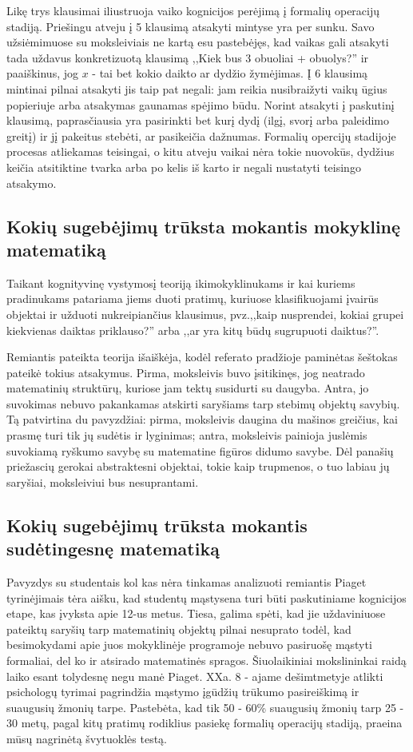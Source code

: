\documentclass{article}
\begin{document}
Likę trys klausimai iliustruoja vaiko kognicijos perėjimą į formalių operacijų stadiją. Priešingu atveju į 5 klausimą atsakyti mintyse yra per sunku. Savo užsiėmimuose su moksleiviais ne kartą esu pastebėjęs, kad vaikas gali atsakyti tada uždavus konkretizuotą klausimą ,,Kiek bus 3 obuoliai + obuolys?'' ir paaiškinus, jog $x$ - tai bet kokio daikto ar dydžio žymėjimas. Į 6 klausimą mintinai pilnai atsakyti jis taip pat negali: jam reikia nusibraižyti vaikų ūgius popieriuje arba atsakymas gaunamas spėjimo būdu. Norint atsakyti į paskutinį klausimą, paprasčiausia yra pasirinkti bet kurį dydį (ilgį, svorį arba paleidimo greitį) ir jį pakeitus stebėti, ar pasikeičia dažnumas. Formalių opercijų stadijoje procesas atliekamas teisingai, o kitu atveju vaikai nėra tokie nuovokūs, dydžius keičia atsitiktine tvarka arba po kelis iš karto ir negali nustatyti teisingo atsakymo. 

\subsection{Kokių sugebėjimų trūksta mokantis mokyklinę matematiką}

Taikant kognityvinę vystymosį teoriją ikimokyklinukams ir kai kuriems pradinukams patariama jiems duoti pratimų, kuriuose
klasifikuojami įvairūs objektai ir užduoti nukreipiančius klausimus, pvz.,,kaip nusprendei, kokiai grupei
kiekvienas daiktas priklauso?'' arba ,,ar yra kitų būdų sugrupuoti daiktus?''. 

Remiantis pateikta teorija išaiškėja, kodėl referato pradžioje paminėtas šeštokas pateikė tokius atsakymus. Pirma, moksleivis buvo įsitikinęs, jog neatrado matematinių struktūrų, kuriose jam tektų susidurti su daugyba. Antra, jo suvokimas nebuvo pakankamas atskirti saryšiams tarp stebimų objektų savybių. Tą patvirtina du pavyzdžiai: pirma, moksleivis daugina du mašinos greičius, kai prasmę turi tik jų sudėtis ir lyginimas; antra, moksleivis painioja juslėmis suvokiamą ryškumo savybę su matematine figūros didumo savybe. Dėl panašių priežascių gerokai abstraktesni objektai, tokie kaip trupmenos, o tuo labiau jų saryšiai, moksleiviui bus nesuprantami. 

\subsection{Kokių sugebėjimų trūksta mokantis sudėtingesnę matematiką}

Pavyzdys su studentais kol kas nėra tinkamas analizuoti remiantis Piaget tyrinėjimais tėra aišku, kad studentų
mąstysena turi būti paskutiniame kognicijos etape, kas įvyksta apie 12-us metus. Tiesa, galima spėti, kad jie uždaviniuose pateiktų saryšių tarp matematinių objektų pilnai nesuprato todėl, kad besimokydami apie juos mokyklinėje programoje
nebuvo pasiruošę mąstyti formaliai, del ko ir atsirado matematinės spragos. Šiuolaikiniai mokslininkai raidą laiko esant tolydesnę negu manė Piaget. XXa. 8 - ajame dešimtmetyje atlikti psichologų tyrimai pagrindžia mąstymo įgūdžių trūkumo pasireiškimą ir suaugusių žmonių tarpe. Pastebėta, kad tik 50 - 60\% suaugusių žmonių tarp 25 - 30 metų, pagal kitų pratimų rodiklius pasiekę formalių operacijų stadiją, praeina mūsų
nagrinėtą švytuoklės testą. 
\end{document}
